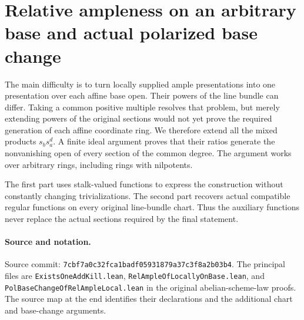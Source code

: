 \section{Relative ampleness on an arbitrary base and actual polarized base change}
\label{sec:polarized-base-change-v056}


The main difficulty is to turn locally supplied ample presentations into
one presentation over each affine base open.  Their powers of the line
bundle can differ.  Taking a common positive multiple resolves that
problem, but merely extending powers of the original sections would
not yet prove the required generation of each affine coordinate ring.
We therefore extend all the mixed products
$s_b s_a^d$.  A finite ideal argument proves that their ratios generate
the nonvanishing open of every section of the common degree.
The argument works over arbitrary rings, including rings with
nilpotents.

The first part uses stalk-valued functions to express the construction
without constantly changing trivializations.  The second part recovers
actual compatible regular functions on every original line-bundle
chart.  Thus the auxiliary functions never replace the actual sections
required by the final statement.

\paragraph{Source and notation.}
Source commit:
\texttt{7cbf7a0c32fca1badf05931879a37c3f8a2b03b4}.
The principal files are
\texttt{Exists\allowbreak One\allowbreak Add\allowbreak Kill.lean},
\texttt{Rel\allowbreak Ample\allowbreak Of\allowbreak Locally\allowbreak On\allowbreak Base.lean}, and
\texttt{Pol\allowbreak Base\allowbreak Change\allowbreak Of\allowbreak Rel\allowbreak Ample\allowbreak Local.lean} in the original
abelian-scheme-law proofs.  The source map at the end identifies their
declarations and the additional chart and base-change arguments.

